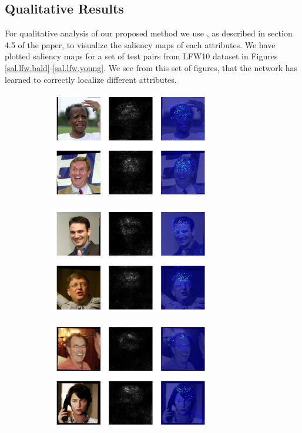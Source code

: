 \documentclass[10pt,twocolumn,letterpaper]{article}
\begin{document}
\subsection{Qualitative Results}
For qualitative analysis of our proposed method we use \cite{saliency}, as described in section 4.5 of the paper, to visualize the saliency maps of each attributes. We have plotted saliency maps for a set of test pairs from LFW10 dataset in Figures \ref{sal.lfw.bald}-\ref{sal.lfw.young}.
We see from this set of figures, that the network has learned to correctly localize different attributes.


\begin{figure}
    \centering
    \begin{subfigure}
        \centering
        \includegraphics[width=7cm]{saliency-new/LFW/bald-1}
    \end{subfigure}
    \begin{subfigure}
        \centering
        \includegraphics[width=7cm]{saliency-new/LFW/bald-2}
    \end{subfigure}
    \begin{subfigure}
        \centering
        \includegraphics[width=7cm]{saliency-new/LFW/bald-4}

\end{subfigure}
\end{figure}
\end{document}
